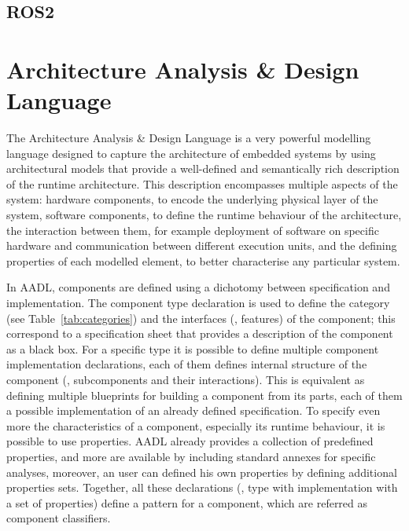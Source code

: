 \subsection{ROS2}


\section{Architecture Analysis \& Design Language}

The Architecture Analysis \& Design Language is a very powerful modelling language designed to capture the architecture of embedded systems by using architectural models that provide a well-defined and semantically rich description of the runtime architecture. This description encompasses multiple aspects of the system: hardware components, to encode the underlying physical layer of the system, software components, to define the runtime behaviour of the architecture, the interaction between them, for example deployment of software on specific hardware and communication between different execution units, and the defining properties of each modelled element, to better characterise any particular system.

In AADL, components are defined using a dichotomy between specification and implementation. The component type declaration is used to define the category (see Table~\ref{tab:categories}) and the interfaces (\ie, features) of the component; this correspond to a specification sheet that provides a description of the component as a black box. For a specific type it is possible to define multiple component implementation declarations, each of them defines internal structure of the component (\ie, subcomponents and their interactions). This is equivalent as defining multiple blueprints for building a component from its parts, each of them a possible implementation of an already defined specification. To specify even more the characteristics of a component, especially its runtime behaviour, it is possible to use properties. AADL already provides a collection of predefined properties, and more are available by including standard annexes for specific analyses, moreover, an user can defined his own properties by defining additional properties sets. Together, all these declarations (\ie, type with implementation with a set of properties) define a pattern for a component, which are referred as component classifiers.
 
